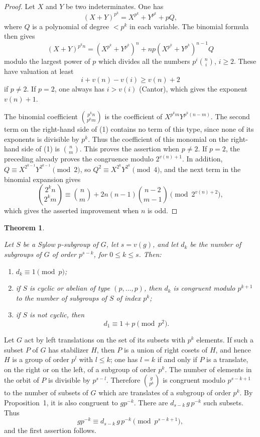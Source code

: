 \documentclass[12pt]{amsart}
\theoremstyle{plain}
\newtheorem{theorem}[lemma]{Theorem}
\begin{document}
\begin{proof}
Let $X$ and $Y$ be two indeterminates. One has
\[
(X+Y)^{p^k}=X^{p^k}+Y^{p^k}+pQ,
\]
where $Q$ is a polynomial of degree $<p^k$ in each variable. The binomial formula then gives
\begin{equation}
(X+Y)^{p^k n}=(X^{p^k}+Y^{p^k})^n+np(X^{p^k}+Y^{p^k})^{n-1}Q
\end{equation}
modulo the largest power of $p$ which divides all the numbers $p^i\binom{n}{i}$, $i\geq 2$. These have valuation at least
\[
i+v(n)-v(i)\geq v(n)+2
\]
if $p\neq 2$. If $p=2$, one always has $i>v(i)$ (Cantor), which gives the exponent $v(n)+1$.

The binomial coefficient $\binom{p^k n}{p^k m}$ is the coefficient of $X^{p^k m}Y^{p^k(n-m)}$. The second term on the right-hand side of (1) contains no term of this type, since none of its exponents is divisible by $p^k$. Thus the coefficient of this monomial on the right-hand side of (1) is $\binom{n}{m}$. This proves the assertion when $p\neq 2$. If $p=2$, the preceding already proves the congruence modulo $2^{v(n)+1}$. In addition, $Q\equiv X^{2^{k-1}}Y^{2^{k-1}}\pmod 2$, so $Q^2\equiv X^{2^k}Y^{2^k}\pmod 4$, and the next term in the binomial expansion gives
\[
\binom{2^k n}{2^k m}\equiv \binom{n}{m}+2n(n-1)\binom{n-2}{m-1}\pmod {2^{v(n)+2}},
\]
which gives the asserted improvement when $n$ is odd.
\end{proof}

\begin{theorem}\ \par
Let $S$ be a Sylow $p$-subgroup of $G$, let $s=v(g)$, and let $d_k$ be the number of subgroups of $G$ of order $p^{s-k}$, for $0\leq k\leq s$. Then:
\begin{enumerate}
\item[(i)] $d_k\equiv 1\pmod p$;
\item[(ii)] if $S$ is cyclic or abelian of type $(p,\ldots,p)$, then $d_k$ is congruent modulo $p^{k+1}$ to the number of subgroups of $S$ of index $p^k$;
\item[(iii)] if $S$ is not cyclic, then
\[
d_1\equiv 1+p\pmod {p^2}.
\]
\end{enumerate}
\end{theorem}

Let $G$ act by left translations on the set of its subsets with $p^k$ elements. If such a subset $P$ of $G$ has stabilizer $H$, then $P$ is a union of right cosets of $H$, and hence $H$ is a group of order $p^l$ with $l\leq k$; one has $l=k$ if and only if $P$ is a translate, on the right or on the left, of a subgroup of order $p^k$. The number of elements in the orbit of $P$ is divisible by $p^{s-l}$. Therefore $\binom{g}{p^k}$ is congruent modulo $p^{s-k+1}$ to the number of subsets of $G$ which are translates of a subgroup of order $p^k$. By Proposition~1, it is also congruent to $gp^{-k}$. There are $d_{s-k}\,g\,p^{-k}$ such subsets. Thus
\[
gp^{-k}\equiv d_{s-k}\,g\,p^{-k}\pmod {p^{s-k+1}},
\]
and the first assertion follows.
\end{document}
